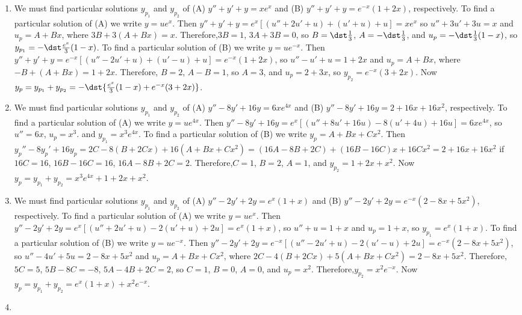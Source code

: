 \documentclass[openany]{book}
\newenvironment{sectionSolutions}{
 \begin{enumerate}[item-label={\thesection.\arabic{enumi}.}]
}{
 \end{enumerate}
}
\begin{document}
\begin{sectionSolutions}
\item
We must find particular solutions $y_{p_1}$ and $y_{p_2}$ of (A)
$y''+y'+y=xe^x$ and (B) $y''+y'+y=e^{-x}(1+2x)$, respectively. To find
a particular solution of (A) we write $y=ue^x$. Then
$y''+y'+y=e^x\left[(u''+2u'+u)+(u'+u)+u\right]= xe^x$ so $u''+3u'+3u
=x$ and $u_p=A+Bx$, where $3B+3(A+Bx)=x$. Therefore,$3B=1$, $3A+3B=0$,
so $B=\dst\frac{1}{3}$, $A=-\dst\frac{1}{3}$, and $u_p=-\dst\frac{1}{3}(1-x)
$, so $y_{p_1}=-\dst\frac{e^x}{3}(1-x)$. To find a particular solution
of (B) we write $y=ue^{-x}$. Then
$y''+y'+y=e^{-x}\left[(u''-2u'+u)+(u'-u)+u\right]= e^{-x}(1+2x)$, so
$u''-u'+u =1+2x$ and $u_p=A+Bx$, where $-B+(A+Bx)=1+2x$. Therefore,
$B=2$, $A-B=1$, so $A=3$, and $u_p=2+3x$, so $y_{p_2}=e^{-x}(3+2x)$.
Now $y_p=y_{p_1}+y_{p_2}=-\dst{\frac{e^x}{3}(1-x)+e^{-x}(3+2x)}$.


\item
We must find particular solutions $y_{p_1}$ and $y_{p_2}$ of (A)
$y''-8y'+16y=6xe^{4x}$ and (B) $y''-8y'+16y=2+16x+16x^2$,
respectively. To find a particular solution of (A) we write
$y=ue^{4x}$. Then
$y''-8y'+16y=e^x\left[(u''+8u'+16u)-8(u'+4u)+16u\right]= 6xe^{4x}$, so
$u'' =6x$, $u_p=x^3$. and $y_{p_1}=x^3e^{4x}$. To find a particular
solution of (B) we write $y_p=A+Bx+Cx^2$. Then
$y_p''-8y_p'+16y_p=2C-8(B+2Cx)+16(A+Bx+Cx^2)=(16A-8B+2C)
+(16B-16C)x+16Cx^2=2+16x+16x^2$ if $16C=16$, $16B-16C=16$,
$16A-8B+2C=2$. Therefore,$C=1$, $B=2$, $A=1$, and $y_{p_2}=1+2x+x^2$.
Now $y_p=y_{p_1}+y_{p_2}=x^3e^{4x}+1+2x+x^2$.


\item
We must find particular solutions $y_{p_1}$ and $y_{p_2}$ of (A)
$y''-2y'+2y=e^x(1+x)$ and (B) $y''-2y'+2y=e^{-x}(2-8x+5x^2)$,
respectively. To find a particular solution of (A) we write $y=ue^x$.
Then $y''-2y'+2y=e^x\left[(u''+2u'+u)-2(u'+u)+2u\right]= e^x(1+x)$, so
$u''+u=1+x$ and $u_p=1+x$, so $y_{p_1}=e^x(1+x)$. To find a particular
solution of (B) we write $y=ue^{-x}$. Then
$y''-2y'+2y=e^{-x}\left[(u''-2u'+u)-2(u'-u)+2u\right]=
e^{-x}(2-8x+5x^2)$, so $u''-4u'+5u =2-8x+5x^2$ and $u_p=A+Bx+Cx^2$,
where $2C-4(B+2Cx)+5(A+Bx+Cx^2)=2-8x+5x^2$. Therefore,$5C=5$,
$5B-8C=-8$, $5A-4B+2C=2$, so $C=1$, $B=0$, $A=0$, and $u_p=x^2$.
Therefore,$y_{p_2}=x^2e^{-x}$. Now
$y_p=y_{p_1}+y_{p_2}=e^x(1+x)+x^2e^{-x}$.


\item
{}
\end{sectionSolutions}
\end{document}
